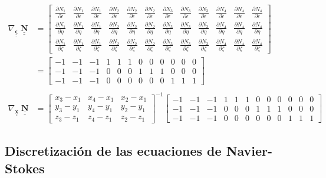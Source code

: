 \documentclass[12pt]{article}
\def\doubleunderline#1{\underline{\underline{#1}}}
\def\diffp[#1]#2{\frac{\partial#1}{\partial#2}}
\def\mt#1{\underline{\underline{\mathbf{#1}}}}
\newcommand{\nb}{\doubleunderline{\mathbf{N}}}
\begin{document}
\begin{align*}
\nabla_{\mt{\epsilon}} \; \nb &=
\begin{bmatrix}
	\diffp[N_1]{\epsilon} & \diffp[N_1]{\epsilon} & \diffp[N_1]{\epsilon} & \diffp[N_2]{\epsilon} & \diffp[N_2]{\epsilon} & \diffp[N_2]{\epsilon} & \diffp[N_3]{\epsilon} & \diffp[N_3]{\epsilon} & \diffp[N_3]{\epsilon} & \diffp[N_4]{\epsilon} & \diffp[N_4]{\epsilon} & \diffp[N_4]{\epsilon} \\ 
	\diffp[N_1]{\eta} & \diffp[N_1]{\eta} & \diffp[N_1]{\eta} & \diffp[N_2]{\eta} & \diffp[N_2]{\eta} & \diffp[N_2]{\eta} & \diffp[N_3]{\eta} & \diffp[N_3]{\eta} & \diffp[N_3]{\eta} & \diffp[N_4]{\eta} & \diffp[N_4]{\eta} & \diffp[N_4]{\eta} \\ 
	\diffp[N_1]{\zeta} & \diffp[N_1]{\zeta} & \diffp[N_1]{\zeta} & \diffp[N_2]{\zeta} & \diffp[N_2]{\zeta} & \diffp[N_2]{\zeta} & \diffp[N_3]{\zeta} & \diffp[N_3]{\zeta} & \diffp[N_3]{\zeta} & \diffp[N_4]{\zeta} & \diffp[N_4]{\zeta} & \diffp[N_4]{\zeta}
\end{bmatrix}
\\
&=
\begin{bmatrix}
	-1 & -1 & -1 & 1 & 1 & 1 & 0 & 0 & 0 & 0 & 0 & 0 \\ 
	-1 & -1 & -1 & 0 & 0 & 0 & 1 & 1 & 1 & 0 & 0 & 0 \\ 
	-1 & -1 & -1 & 0 & 0 & 0 & 0 & 0 & 0 & 1 & 1 & 1
\end{bmatrix}
\\ \\
\nabla_{\mt{x}} \; \nb &=
\begin{bmatrix}
	x_3 - x_1 & x_4 - x_1 & x_2 - x_1 \\
	y_3 - y_1 & y_4 - y_1 & y_2 - y_1 \\
	z_3 - z_1 & z_4 - z_1 & z_2 - z_1
\end{bmatrix}^{-1}
\begin{bmatrix}
	-1 & -1 & -1 & 1 & 1 & 1 & 0 & 0 & 0 & 0 & 0 & 0 \\ 
	-1 & -1 & -1 & 0 & 0 & 0 & 1 & 1 & 1 & 0 & 0 & 0 \\ 
	-1 & -1 & -1 & 0 & 0 & 0 & 0 & 0 & 0 & 1 & 1 & 1
\end{bmatrix}
\end{align*}

\subsection{Discretizaci\'on de las ecuaciones de Navier-Stokes}
\end{document}
